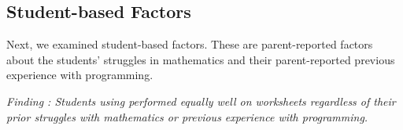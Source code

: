 {%



 
 \subsection{Student-based Factors}
 
 Next, we examined student-based factors. These are parent-reported factors about the students' struggles in mathematics and their parent-reported previous experience with programming.
 
 \textit{Finding : Students using \ts{} performed equally well on worksheets regardless of their prior struggles with mathematics or previous experience with programming.}
 
}
